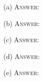 (a)
\textsc{Answer:}\vspace{-2mm}
\begin{answerlong}

\end{answerlong}

(b)
\textsc{Answer:}\vspace{-2mm}
\begin{answerlong}

\end{answerlong}

(c)
\textsc{Answer:}\vspace{-2mm}
\begin{answerlong}

\end{answerlong}

(d)
\textsc{Answer:}\vspace{-2mm}
\begin{answerlong}

\end{answerlong}

(e)
\textsc{Answer:}\vspace{-2mm}
\begin{answerlong}

\end{answerlong}
